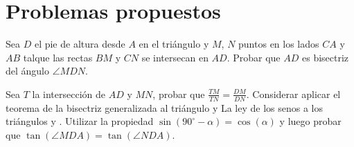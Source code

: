 \section{Problemas propuestos}

\begin{section-problem}
    Sea $D$ el pie de altura desde $A$ en el triángulo  y $M$, $N$ puntos en los lados $CA$ y $AB$ talque las rectas $BM$ y $CN$ se intersecan en $AD$.
    Probar que $AD$ es bisectriz del ángulo $\angle MDN$.
\end{section-problem}

\begin{hint}
    Sea $T$ la intersección de $AD$ y $MN$, probar que $\frac{TM}{TN} = \frac{DM}{DN}$.
    Considerar aplicar el teorema de la bisectriz generalizada al triángulo  y La ley de los senos a los triángulos  y .
    Utilizar la propiedad $\sin(90^\circ - \alpha) = \cos(\alpha)$ y luego probar que $\tan(\angle MDA) = \tan(\angle NDA)$.
\end{hint}

